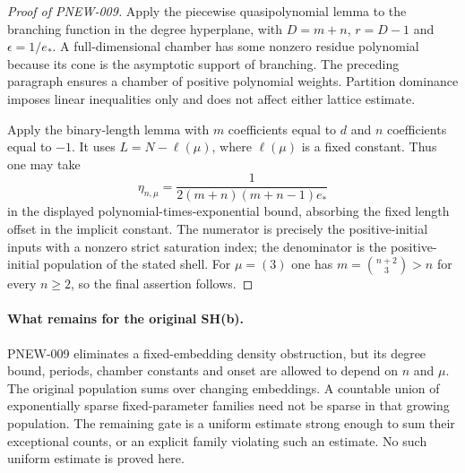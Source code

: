 \begin{proof}[Proof of PNEW-009]
Apply the piecewise quasipolynomial lemma to the branching
function in the degree hyperplane, with $D=m+n$,
$r=D-1$ and $\epsilon=1/e_*$.  A full-dimensional chamber
has some nonzero residue polynomial because its cone is
the asymptotic support of branching.  The preceding
paragraph ensures a chamber of positive polynomial weights.
Partition dominance imposes linear inequalities only and
does not affect either lattice estimate.

Apply the binary-length lemma with $m$ coefficients equal
to $d$ and $n$ coefficients equal to $-1$.
It uses $L=N-\ell(\mu)$, where $\ell(\mu)$ is a fixed
constant.  Thus one may take
\[
                \eta_{n,\mu}
                    =\frac1{2(m+n)(m+n-1)e_*}
\]
in the displayed polynomial-times-exponential bound,
absorbing the fixed length offset in the implicit constant.
The numerator is precisely the positive-initial inputs
with a nonzero strict saturation index; the denominator is
the positive-initial population of the stated shell.
For $\mu=(3)$ one has $m=\binom{n+2}{3}>n$ for every
$n\ge2$, so the final assertion follows.
\end{proof}

\paragraph{What remains for the original SH(b).}
PNEW-009 eliminates a fixed-embedding density obstruction,
but its degree bound, periods, chamber constants and onset
are allowed to depend on $n$ and $\mu$.  The original
population sums over changing embeddings.  A countable
union of exponentially sparse fixed-parameter families need
not be sparse in that growing population.  The remaining
gate is a uniform estimate strong enough to sum their
exceptional counts, or an explicit family violating such
an estimate.  No such uniform estimate is proved here.

